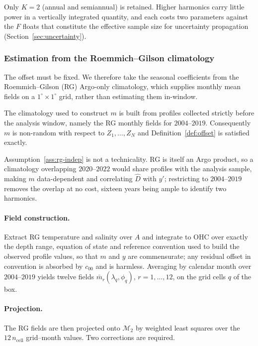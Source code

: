 Only $K=2$ (annual and semiannual) is retained. Higher harmonics carry
little power in a vertically integrated quantity, and each costs two
parameters against the $F$ floats that constitute the effective sample
size for uncertainty propagation (Section~\ref{sec:uncertainty}).

\subsubsection{Estimation from the Roemmich--Gilson climatology}
\label{sec:rg}

The offset must be fixed. We therefore take the seasonal coefficients
from the Roemmich--Gilson (RG) Argo-only climatology, which supplies
monthly mean fields on a $1^\circ\times1^\circ$ grid, rather than
estimating them in-window.

\begin{assumption}
\label{ass:rg-indep}
The climatology used to construct $m$ is built from profiles collected
strictly before the analysis window, namely the RG monthly fields for
$2004$--$2019$. Consequently $m$ is non-random with respect to
$Z_1,\dots,Z_N$ and Definition~\ref{def:offset} is satisfied exactly.
\end{assumption}

Assumption~\ref{ass:rg-indep} is not a technicality. RG is itself an
Argo product, so a climatology overlapping $2020$--$2022$ would share
profiles with the analysis sample, making $m$ data-dependent and
correlating $\hat D$ with $y'$; restricting to $2004$--$2019$ removes
the overlap at no cost, sixteen years being ample to identify two
harmonics.

\paragraph{Field construction.} Extract RG temperature and salinity over
$A$ and integrate to OHC over exactly the depth range, equation of state
and reference convention used to build the observed profile values, so
that $m$ and $y$ are commensurate; any residual offset in convention is
absorbed by $c_{00}$ and is harmless. Averaging by calendar month over
$2004$--$2019$ yields twelve fields $\bar m_r(\lambda_q,\phi_q)$,
$r=1,\dots,12$, on the grid cells $q$ of the box.

\paragraph{Projection.} The RG fields are then projected onto
$\mathcal M_2$ by weighted least squares over the $12\,n_{\mathrm{cell}}$ grid--month
values. Two corrections are required.

